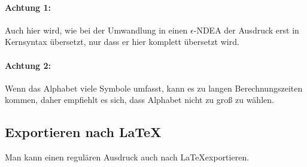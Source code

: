 \paragraph*{Achtung 1:} Auch hier wird, wie bei der Umwandlung in einen $\epsilon$-NDEA der Ausdruck erst in Kernsyntax übersetzt, nur dass er hier komplett übersetzt wird.

\paragraph*{Achtung 2:} Wenn das Alphabet viele Symbole umfasst, kann es zu langen Berechnungszeiten kommen, daher empfiehlt es sich, dass Alphabet nicht zu groß zu wählen.

\subsection{Exportieren nach \LaTeX}

Man kann einen regulären Ausdruck auch nach \LaTeX  exportieren.
